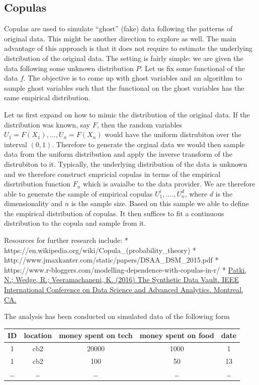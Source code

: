 \documentclass[]{article}
\begin{document}
\subsection{Copulas}\label{copulas}

Copulas are used to simulate ``ghost'' (fake) data following the
patterns of original data. This might be another direction to explore as
well. The main advantage of this approach is that it does not require to
estimate the underlying distribution of the original data. The setting
is fairly simple: we are given the data following some unknown
distribution \(P\). Let us fix some functional of the data \(f\). The
objective is to come up with ghost variables and an algorithm to sample
ghost variables such that the functional on the ghost variables has the
same empirical distribution.

Let us first expand on how to mimic the distribution of the original
data. If the distribution was known, say \(F\), then the random
variables \(U_1 = F(X_1), ..., U_n = F(X_n)\) would have the uniform
distrubiton over the interval \((0,1)\). Therefore to generate the
orginal data we would then sample data from the uniform distribution and
apply the inverse transform of the distrubiton to it. Typically, the
underlying distribution of the data is unknown and we therefore
construct empricial copulas in terms of the empirical disrtribution
function \(F_n\) which is avaialbe to the data provider. We are
therefore able to generate the sample of empirical copulas
\(U_1^i, ...., U_n^d\), where \(d\) is the dimensionality and \(n\) is
the sample size. Based on this sample we able to define the empirical
distribution of copulas. It then suffices to fit a continuous
distribution to the copula and sample from it.

Resources for further research include: *
https://en.wikipedia.org/wiki/Copula\_(probability\_theory) *
http://www.jmaxkanter.com/static/papers/DSAA\_DSM\_2015.pdf *
https://www.r-bloggers.com/modelling-dependence-with-copulas-in-r/ *
\href{http://dai.lids.mit.edu/pdf/SDV2.pdf}{Patki, N.; Wedge, R.;
Veeramachaneni, K. (2016) The Synthetic Data Vault. IEEE International
Conference on Data Science and Advanced Analytics. Montreal, CA.}

The analysis has been conducted on simulated data of the following form

\begin{longtable}[]{@{}ccccc@{}}
\toprule
ID & location & money spent on tech & money spent on food &
date\tabularnewline
\midrule
\endhead
1 & cb2 & 20000 & 1000 & 1\tabularnewline
1 & cb2 & 100 & 50 & 13\tabularnewline
\ldots{} & \ldots{} & \ldots{} & \ldots{} & \ldots{}\tabularnewline
\bottomrule
\end{longtable}
\end{document}
